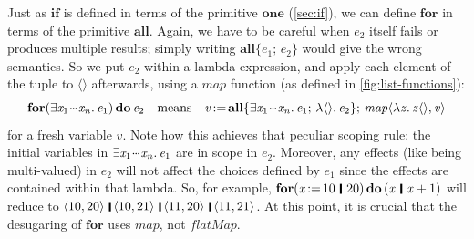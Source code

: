 \documentclass[acmsmall]{acmart}
\newcommand{\Varid}[1]{\mathit{#1}}
\begin{document}
Just as \ensuremath{\textbf{if}} is defined in terms of the primitive \ensuremath{\textbf{one}} (\cref{sec:if}), we can define \ensuremath{\textbf{for}}
in terms of the primitive \ensuremath{\textbf{all}}.
Again, we have to be careful when \ensuremath{\Varid{e}_{\mathrm{2}}} itself fails or produces multiple results;
simply writing \ensuremath{\textbf{all}\{\Varid{e}_{\mathrm{1}};\,\Varid{e}_{\mathrm{2}}\}} would give the wrong semantics. So we put \ensuremath{\Varid{e}_{\mathrm{2}}} within a lambda expression, and
apply each element of the tuple to \ensuremath{\langle\rangle} afterwards, using a \ensuremath{\Varid{map}} function (as defined in \cref{fig:list-functions}):
\[
\ensuremath{\textbf{for}(\exists\Varid{x}_{\mathrm{1}}\hspace{0.1em}\mydots\hspace{0.1em}\Varid{x}_{\Varid{n}}.\,\Varid{e}_{\mathrm{1}})\,\textbf{do}\,\Varid{e}_{\mathrm{2}}} \quad \text{means} \quad
\ensuremath{\Varid{v}\hspace{-0.14em}:=\hspace{-0.14em}\textbf{all}\{\exists\Varid{x}_{\mathrm{1}}\hspace{0.1em}\mydots\hspace{0.1em}\Varid{x}_{\Varid{n}}.\,\Varid{e}_{\mathrm{1}};\,\lambda \langle\rangle.\,\Varid{e}_{\mathrm{2}}\};\,\Varid{map}\langle\lambda\Varid{z}.\,\Varid{z}\langle\rangle,\Varid{v}\rangle}
\]
for a fresh variable \ensuremath{\Varid{v}}.
Note how this achieves that peculiar scoping rule: the initial variables in \ensuremath{\exists\Varid{x}_{\mathrm{1}}\hspace{0.1em}\mydots\hspace{0.1em}\Varid{x}_{\Varid{n}}.\,\Varid{e}_{\mathrm{1}}} are in scope in \ensuremath{\Varid{e}_{\mathrm{2}}}.
Moreover, any effects (like being multi-valued) in \ensuremath{\Varid{e}_{\mathrm{2}}} will not affect the choices defined by \ensuremath{\Varid{e}_{\mathrm{1}}} since the effects are contained within that lambda.
So, for example, \ensuremath{\textbf{for}(\Varid{x}\hspace{-0.14em}:=\hspace{-0.14em}\mathrm{10}\hspace{0.2em}\mathop{\rule[-0.1em]{0.15em}{0.75em}}\hspace{0.2em}\mathrm{20})\,\textbf{do}\,(\Varid{x}\hspace{0.2em}\mathop{\rule[-0.1em]{0.15em}{0.75em}}\hspace{0.2em}\Varid{x}\mathbin{+}\mathrm{1})} will reduce to
\ensuremath{\langle{}\mathrm{10},\mathrm{20}\rangle\hspace{0.2em}\mathop{\rule[-0.1em]{0.15em}{0.75em}}\hspace{0.2em}\langle{}\mathrm{10},\mathrm{21}\rangle\hspace{0.2em}\mathop{\rule[-0.1em]{0.15em}{0.75em}}\hspace{0.2em}\langle{}\mathrm{11},\mathrm{20}\rangle\hspace{0.2em}\mathop{\rule[-0.1em]{0.15em}{0.75em}}\hspace{0.2em}\langle{}\mathrm{11},\mathrm{21}\rangle}.
At this point, it is crucial that the desugaring of \ensuremath{\textbf{for}} uses \ensuremath{\Varid{map}}, not \ensuremath{\Varid{flatMap}}.
\end{document}
